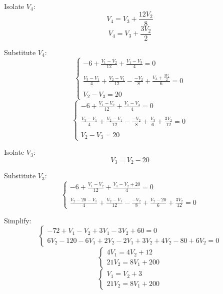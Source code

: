 \documentclass{article}
\begin{document}
			Isolate $V_4$:
				\[V_4 = V_3 + \frac{12V_2}{8}\]
				\[V_4 = V_3 + \frac{3V_2}{2}\]

			Substitute $V_4$:
				\begin{equation*}\begin{cases}
					\displaystyle -6 + \frac{V_1 - V_2}{12} + \frac{V_1 - V_3}{4} = 0 \\ \\
					\displaystyle \frac{V_3 - V_1}{4} + \frac{V_2 - V_1}{12} - \frac{-V_2}{8} + \frac{V_3 + \frac{3V_2}{2}}{6} = 0 \\ \\
					\displaystyle V_2 - V_3 = 20
				\end{cases}\end{equation*}
				\begin{equation*}\begin{cases}
					\displaystyle -6 + \frac{V_1 - V_2}{12} + \frac{V_1 - V_3}{4} = 0 \\ \\
					\displaystyle \frac{V_3 - V_1}{4} + \frac{V_2 - V_1}{12} - \frac{-V_2}{8} + \frac{V_3}{6} + \frac{3V_2}{12} = 0 \\ \\
					\displaystyle V_2 - V_3 = 20
				\end{cases}\end{equation*}

			Isolate $V_3$:
				\[V_3 = V_2 - 20\]

			Substitute $V_3$:
				\begin{equation*}\begin{cases}
					\displaystyle -6 + \frac{V_1 - V_2}{12} + \frac{V_1 - V_2 + 20}{4} = 0 \\ \\
					\displaystyle \frac{V_2 - 20 - V_1}{4} + \frac{V_2 - V_1}{12} - \frac{-V_2}{8} + \frac{V_2 - 20}{6} + \frac{3V_2}{12} = 0
				\end{cases}\end{equation*}

			Simplify:
				\begin{equation*}\begin{cases}
					\displaystyle -72 + V_1 - V_2 + 3V_1 - 3V_2 + 60 = 0 \\
					\displaystyle 6V_2 - 120 - 6V_1 + 2V_2 - 2V_1 + 3V_2 + 4V_2 - 80 + 6V_2 = 0
				\end{cases}\end{equation*}
				\begin{equation*}\begin{cases}
					\displaystyle 4V_1 = 4V_2 + 12 \\
					\displaystyle 21V_2 = 8V_1 + 200
				\end{cases}\end{equation*}
				\begin{equation*}\begin{cases}
					\displaystyle V_1 = V_2 + 3 \\
					\displaystyle 21V_2 = 8V_1 + 200
				\end{cases}\end{equation*}
\end{document}
